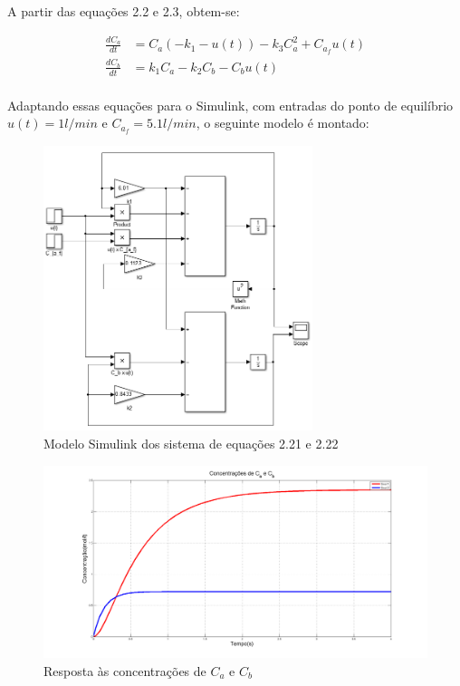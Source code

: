 \documentclass[a4paper,12pt]{report}
\begin{document}
A partir das equações 2.2 e 2.3, obtem-se:

\begin{align}
\frac{dC_a}{dt} &= C_a(-k_1-u(t))- k_3 C_a^2 +C_{a_f} u(t)\\
\frac{dC_b}{dt} &= k_1 C_a - k_2 C_b - C_b u(t)\\
\end{align}

Adaptando essas equações para o Simulink, com entradas do ponto de equilíbrio \(u(t) = 1 l/min\) e \(C_{a_f} = 5.1 l/min\), o seguinte modelo é montado:


 \begin{figure}[H]
  \centering
  \includegraphics[width=0.7\textwidth]{Imagens/Q2Simu.png}
  \caption{Modelo Simulink dos sistema de equações 2.21 e 2.22}
  \end{figure}


 \begin{figure}[H]
  \centering
  \includegraphics[width=1\textwidth]{Imagens/Q2.png}
  \caption{Resposta às concentrações de $C_a$ e $C_b$}
  \end{figure}
\end{document}
